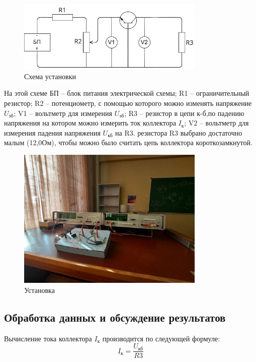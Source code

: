 \begin{figure}[H]
\centering
\includegraphics[width=0.8\textwidth]{Схема установки}
\caption{Схема установки}
\label{fig:Схема установки}
\end{figure}
На этой схеме БП – блок питания электрической схемы; R1 – ограничительный
резистор; R2 – потенциометр, с помощью которого можно изменять напряжение $U_{\text{эб}}$; V1 – вольтметр для измерения $U_{\text{эб}}$; R3 – резистор в цепи к-б,по падению напряжения на котором можно измерить ток коллектора $I_{\text{к}}$; V2 – вольтметр для измерения падения напряжения $U_{\text{кб}}$ на R3.
 резистора R3 выбрано достаточно малым (12,0Ом), чтобы
можно было считать цепь коллектора короткозамкнутой.


\begin{figure}[H]
\centering
\includegraphics[width=0.8\textwidth]{Установка.jpg}
\caption{Установка}
\label{fig:установка}
\end{figure}

\subsection{Обработка данных и обсуждение результатов}
Вычисление тока коллектора $I_{\text{к}}$ производится по следующей формуле:
\begin{equation}
   I_{\text{к}}=\frac{U_{\text{кб}}}{R3}
   \label{eq:5}
\end{equation}

